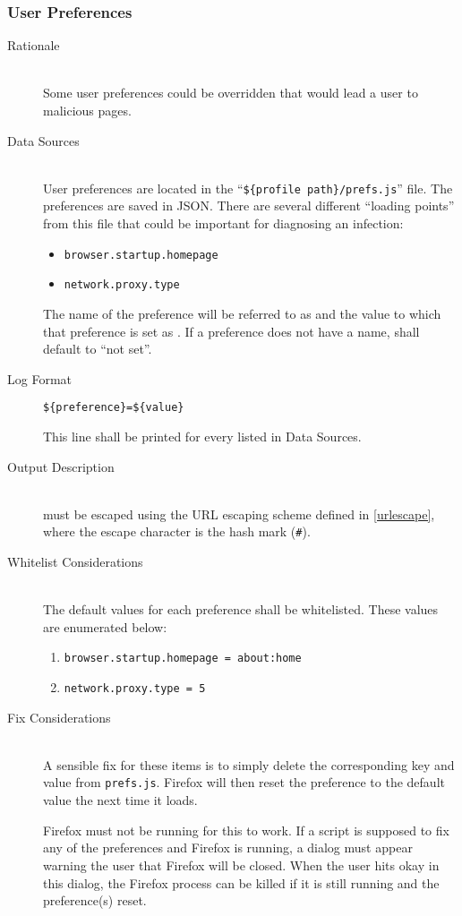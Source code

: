 \subsubsection{User Preferences} \label{sec:ff_user_preferences}
\begin{description}
\item[Rationale] \hfill \\
Some user preferences could be overridden that would lead a user to malicious
pages.  
\item[Data Sources] \hfill \\
User preferences are located in the ``\verb|${profile path}/prefs.js|'' file. 
The preferences are saved in JSON. There are several different
``loading points'' from this file that could be important for diagnosing an
infection:
\begin{itemize}
  \item \verb|browser.startup.homepage|
  \item \verb|network.proxy.type|
\end{itemize}
The name of the preference will be referred to as  and the
value to which that preference is set as .  If a preference does not
have a name,  shall default to ``not set''.
\item[Log Format] \hfill 
\vspace{-\baselineskip}
\begin{verbatim}
${preference}=${value}
\end{verbatim}
This line shall be printed for every  listed in Data Sources.
\item[Output Description] \hfill \\
 must be escaped using the URL escaping scheme defined in
\ref{urlescape}, where the escape character is the hash mark (\verb|#|).
\item[Whitelist Considerations] \hfill \\
The default values for each preference shall be whitelisted.  These values are
enumerated below:
\begin{enumerate}
  \item \verb|browser.startup.homepage = about:home|
  \item \verb|network.proxy.type = 5|
\end{enumerate}

\item[Fix Considerations] \hfill \\
A sensible fix for these items is to simply delete the corresponding key and
value from \verb|prefs.js|.  Firefox will then reset the preference to the
default value the next time it loads.

Firefox must not be running for this to work.  If a script is supposed to fix
any of the preferences and Firefox is running, a dialog must appear warning the
user that Firefox will be closed.  When the user hits okay in this dialog, the
Firefox process can be killed if it is still running and the preference(s)
reset.
\end{description}


